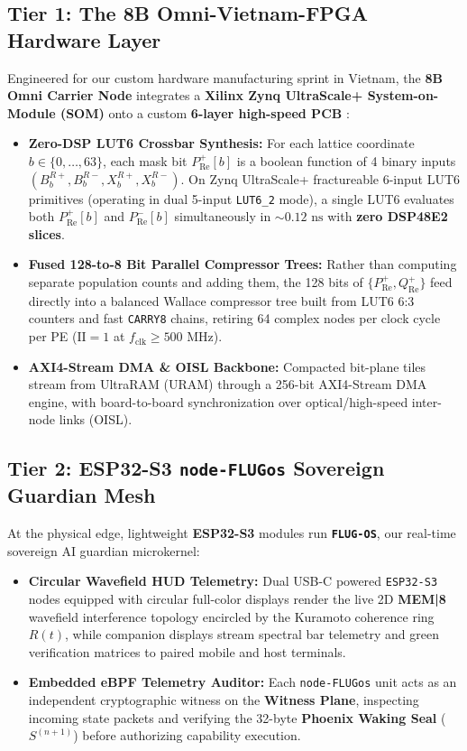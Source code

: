 \documentclass[10pt, twocolumn, a4paper]{article}
\begin{document}
\subsection{Tier 1: The 8B Omni-Vietnam-FPGA Hardware Layer}
Engineered for our custom hardware manufacturing sprint in Vietnam, the \textbf{8B Omni Carrier Node} integrates a \textbf{Xilinx Zynq UltraScale+ System-on-Module (SOM)} onto a custom \textbf{6-layer high-speed PCB} \cite{lodri2026omni}:
\begin{itemize}
    \item \textbf{Zero-DSP LUT6 Crossbar Synthesis:} For each lattice coordinate $b \in \{0, \dots, 63\}$, each mask bit $P_{\text{Re}}^+[b]$ is a boolean function of 4 binary inputs $(B_b^{R+}, B_b^{R-}, X_b^{R+}, X_b^{R-})$. On Zynq UltraScale+ fractureable 6-input LUT6 primitives (operating in dual 5-input \texttt{LUT6\_2} mode), a single LUT6 evaluates both $P_{\text{Re}}^+[b]$ and $P_{\text{Re}}^-[b]$ simultaneously in $\sim 0.12\text{ ns}$ with \textbf{zero DSP48E2 slices}.
    \item \textbf{Fused 128-to-8 Bit Parallel Compressor Trees:} Rather than computing separate population counts and adding them, the 128 bits of $\{P_{\text{Re}}^+, Q_{\text{Re}}^+\}$ feed directly into a balanced Wallace compressor tree built from LUT6 6:3 counters and fast \texttt{CARRY8} chains, retiring 64 complex nodes per clock cycle per PE ($\text{II}=1$ at $f_{\text{clk}} \ge 500\text{ MHz}$).
    \item \textbf{AXI4-Stream DMA \& OISL Backbone:} Compacted bit-plane tiles stream from UltraRAM (URAM) through a 256-bit AXI4-Stream DMA engine, with board-to-board synchronization over optical/high-speed inter-node links (OISL).
\end{itemize}

\subsection{Tier 2: ESP32-S3 \texttt{node-FLUGos} Sovereign Guardian Mesh}
At the physical edge, lightweight \textbf{ESP32-S3} modules run \textbf{\texttt{FLUG-OS}}, our real-time sovereign AI guardian microkernel:
\begin{itemize}
    \item \textbf{Circular Wavefield HUD Telemetry:} Dual USB-C powered \texttt{ESP32-S3} nodes equipped with circular full-color displays render the live 2D \textbf{MEM|8} wavefield interference topology encircled by the Kuramoto coherence ring $R(t)$, while companion displays stream spectral bar telemetry and green verification matrices to paired mobile and host terminals.
    \item \textbf{Embedded eBPF Telemetry Auditor:} Each \texttt{node-FLUGos} unit acts as an independent cryptographic witness on the \textbf{Witness Plane}, inspecting incoming state packets and verifying the 32-byte \textbf{Phoenix Waking Seal} ($S^{(n+1)}$) before authorizing capability execution.
\end{itemize}
\end{document}
